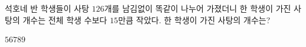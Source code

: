 석호네 반 학생들이 사탕 $126$개를 남김없이 똑같이 나누어 가졌더니 한 학생이 가진 사탕의 개수는 전체 학생 수보다 $15$만큼 작았다. 한 학생이 가진 사탕의 개수는?
\begin{choices32}{$5$}{$6$}{$7$}{$8$}{$9$}\end{choices32}
